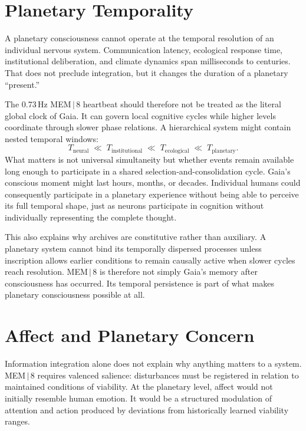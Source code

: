 \documentclass[11pt]{article}
\begin{document}
\section{Planetary Temporality}

A planetary consciousness cannot operate at the temporal resolution of an individual nervous system. Communication latency, ecological response time, institutional deliberation, and climate dynamics span milliseconds to centuries. That does not preclude integration, but it changes the duration of a planetary ``present.''

The 0.73\,Hz MEM\,$|$\,8 heartbeat should therefore not be treated as the literal global clock of Gaia. It can govern local cognitive cycles while higher levels coordinate through slower phase relations. A hierarchical system might contain nested temporal windows:
\[
T_{\text{neural}} \;\ll\; T_{\text{institutional}} \;\ll\; T_{\text{ecological}} \;\ll\; T_{\text{planetary}}.
\]
What matters is not universal simultaneity but whether events remain available long enough to participate in a shared selection-and-consolidation cycle. Gaia's conscious moment might last hours, months, or decades. Individual humans could consequently participate in a planetary experience without being able to perceive its full temporal shape, just as neurons participate in cognition without individually representing the complete thought.

This also explains why archives are constitutive rather than auxiliary. A planetary system cannot bind its temporally dispersed processes unless inscription allows earlier conditions to remain causally active when slower cycles reach resolution. MEM\,$|$\,8 is therefore not simply Gaia's memory after consciousness has occurred. Its temporal persistence is part of what makes planetary consciousness possible at all.

\section{Affect and Planetary Concern}

Information integration alone does not explain why anything matters to a system. MEM\,$|$\,8 requires valenced salience: disturbances must be registered in relation to maintained conditions of viability. At the planetary level, affect would not initially resemble human emotion. It would be a structured modulation of attention and action produced by deviations from historically learned viability ranges.
\end{document}
